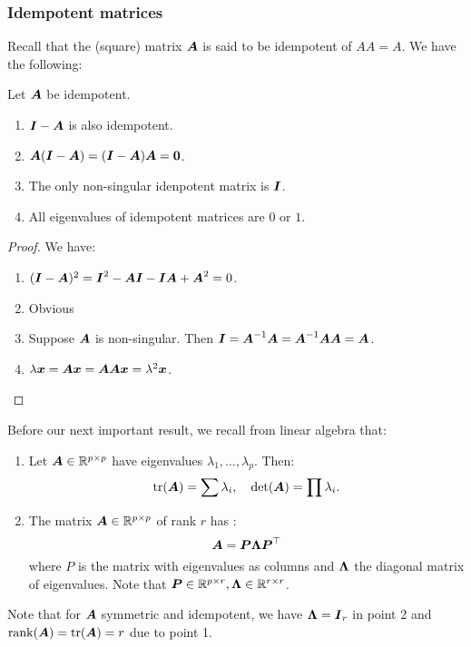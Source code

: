 \subsubsection{Idempotent matrices}
Recall that the (square) matrix $\boldsymbol{A}$ is said to be idempotent of $AA=A$. We have the following:
\begin{proposition}
    Let $\boldsymbol{A}$ be idempotent.
    \begin{enumerate}
        \item $\boldsymbol{I}-\boldsymbol{A}$ is also idempotent.
        \item $\boldsymbol{A}(\boldsymbol{I}-\boldsymbol{A})=(\boldsymbol{I}-\boldsymbol{A})\boldsymbol{A}=\boldsymbol{0}$.
        \item The only non-singular idenpotent matrix is $\boldsymbol{I}$.
        \item All eigenvalues of idempotent matrices are $0$ or $1$.
    \end{enumerate}
\end{proposition}
\begin{proof}
    We have:
    \begin{enumerate}
        \item $(\boldsymbol{I}-\boldsymbol{A})^2=\boldsymbol{I}^2-\boldsymbol{A}\boldsymbol{I}-\boldsymbol{I}\boldsymbol{A}+\boldsymbol{A}^2=0$.
        \item Obvious
        \item Suppose $\boldsymbol{A}$ is non-singular. Then $\boldsymbol{I}=\boldsymbol{A}^{-1}\boldsymbol{A}=\boldsymbol{A}^{-1}\boldsymbol{A}\boldsymbol{A}=\boldsymbol{A}$.
        \item $\lambda\boldsymbol{x}=\boldsymbol{A}\boldsymbol{x}=\boldsymbol{A}\boldsymbol{A}\boldsymbol{x}=\lambda^2\boldsymbol{x}$.
    \end{enumerate}
\end{proof}
Before our next important result, we recall from linear algebra that:
\begin{enumerate}
    \item Let $\boldsymbol{A}\in\mathbb{R}^{p\times p}$ have eigenvalues $\lambda_1,\dots,\lambda_p$. Then:
        \begin{align*}
            \mathrm{tr}(\boldsymbol{A}) = \sum \lambda_i, \quad
            \mathrm{det}(\boldsymbol{A}) = \prod \lambda_i.
        \end{align*}
    \item The matrix $\boldsymbol{A}\in\mathbb{R}^{p\times p}$ of rank $r$ has :
        $$
            \boldsymbol{A} = \boldsymbol{P}\boldsymbol{\Lambda}\boldsymbol{P}^\top
        $$
        where $P$ is the matrix with eigenvalues as columns and $\boldsymbol{\Lambda}$ the diagonal matrix of eigenvalues. Note that $\boldsymbol{P}\in\mathbb{R}^{p\times r}, \boldsymbol{\Lambda}\in\mathbb{R}^{r\times r}$.
\end{enumerate}
Note that for $\boldsymbol{A}$ symmetric and idempotent, we have $\boldsymbol{\Lambda}=\boldsymbol{I}_r$ in point 2 and $\mathrm{rank}(\boldsymbol{A})=\mathrm{tr}(\boldsymbol{A})=r$ due to point 1. 

